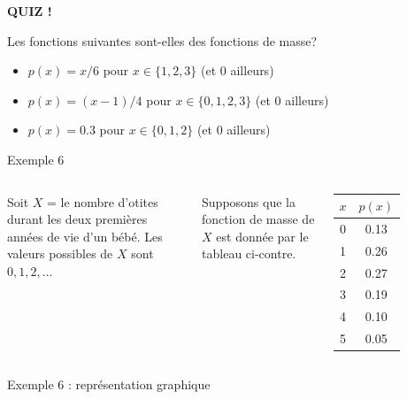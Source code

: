 \documentclass{BeamerTemplate}
\begin{document}
\begin{frame}[plain,t]
  \centerline{\LARGE\bfseries\alert{QUIZ !}}

  \medskip
  Les fonctions suivantes sont-elles des fonctions de masse?
  \begin{itemize}\itemsep 1.2cm
    \item $p(x) = x/6$ \quad pour $x \in \{1, 2, 3\}$ (et 0 ailleurs)
    \item $p(x) = (x-1)/4$ \quad pour $x \in \{0, 1, 2, 3\}$ (et 0 ailleurs)
    \item $p(x) = 0.3$ \quad pour $x \in \{0, 1, 2\}$ (et 0 ailleurs)
  \end{itemize}
\end{frame}

\begin{frame}[t]{Exemple 6}
  \begin{columns}[T]
      Soit $X$ = le nombre d'otites durant les deux premières années de vie
      d'un bébé. Les valeurs possibles de $X$ sont $0, 1, 2, \ldots$

      \medskip
      Supposons que la fonction de masse de $X$ est donnée par le tableau
      ci-contre.

      \medskip
      \centering
      \renewcommand{\arraystretch}{1.1}
      \begin{tabular}{c|c}
        \toprule
        $x$ & $p(x)$ \\
        \midrule
        0 & 0.13 \\
        1 & 0.26 \\
        2 & 0.27 \\
        3 & 0.19 \\
        4 & 0.10 \\
        5 & 0.05 \\
        \bottomrule
      \end{tabular}
  \end{columns}
\end{frame}

\begin{frame}[t]{Exemple 6 : représentation graphique}
  \centering
\end{frame}
\end{document}
